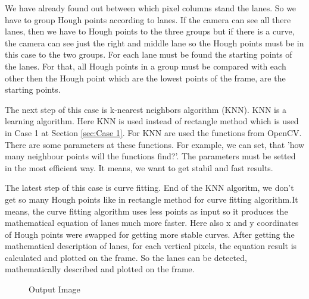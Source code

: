 We have already found out between which pixel columns stand the lanes. So we have to group Hough points according to lanes. If the camera can see all there lanes, then we have to Hough points to the three groups but if there is a curve, the camera can see just the right and middle lane so the Hough points must be in this case to the two groups. For each lane must be found the starting points of the lanes. For that, all Hough points in a group must be compared with each other then the Hough point which are the lowest points of the frame, are the starting points. 

The next step of this case is k-nearest neighbors algorithm (KNN). KNN is a learning algorithm. Here KNN is used instead of rectangle method which is used in Case 1 at Section \ref{sec:Case 1}. For KNN are used the functions from OpenCV. There are some parameters at these functions. For example, we can set, that 'how many neighbour points will the functions find?'. The parameters must be setted in the most efficient way. It means, we want to get stabil and fast results. 

The latest step of this case is curve fitting. End of the KNN algoritm, we don't get so many Hough points like in rectangle method for curve fitting algorithm.It means, the curve fitting algorithm uses less points as input so it produces the mathematical equation of lanes much more faster. Here also x and y coordinates of Hough points were swapped for getting more stable curves. After getting the mathematical description of lanes, for each vertical pixels, the equation result is calculated and plotted on the frame. So the lanes can be detected, mathematically described and plotted on the frame.

\begin{figure}[H]
  \centering
  \caption{Output Image}
\end{figure} 


